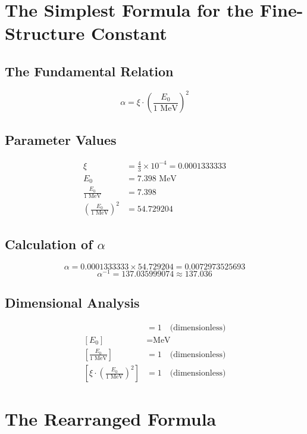 	\section*{The Simplest Formula for the Fine-Structure Constant}
	
	\subsection*{The Fundamental Relation}
	
	\[
	\boxed{\alpha = \xi \cdot \left(\frac{E_0}{1 \text{ MeV}}\right)^2}
	\]
	
	\subsection*{Parameter Values}
	
	\begin{align*}
		\xi &= \frac{4}{3} \times 10^{-4} = 0.0001333333 \\
		E_0 &= 7.398 \text{ MeV} \\
		\frac{E_0}{1 \text{ MeV}} &= 7.398 \\
		\left(\frac{E_0}{1 \text{ MeV}}\right)^2 &= 54.729204
	\end{align*}
	
	\subsection*{Calculation of $\alpha$}
	
	\[
	\alpha = 0.0001333333 \times 54.729204 = 0.0072973525693
	\]
	\[
	\alpha^{-1} = 137.035999074 \approx 137.036
	\]
	
	\subsection*{Dimensional Analysis}
	
	\begin{align*}
		[\xi] &= 1 \quad \text{(dimensionless)} \\
		[E_0] &= \text{MeV} \\
		\left[\frac{E_0}{1 \text{ MeV}}\right] &= 1 \quad \text{(dimensionless)} \\
		\left[\xi \cdot \left(\frac{E_0}{1 \text{ MeV}}\right)^2\right] &= 1 \quad \text{(dimensionless)}
	\end{align*}
	
	\section*{The Rearranged Formula}
	
